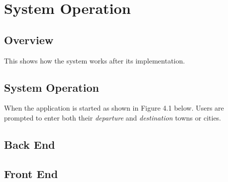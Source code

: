 
\chapter{System Operation} %



\ifpdf
    \graphicspath{{4/figures/PNG/}{4/figures/PDF/}{4/figures/}}
\else
    \graphicspath{{4/figures/EPS/}{4/figures/}}
\fi

\section{Overview}
This shows how the system works after its implementation. 

\section{System Operation}
When the application is started as shown in Figure 4.1 below. Users are prompted to enter both their \textit{departure} and \textit{destination} towns or cities.


\section{Back End}

\section{Front End}







